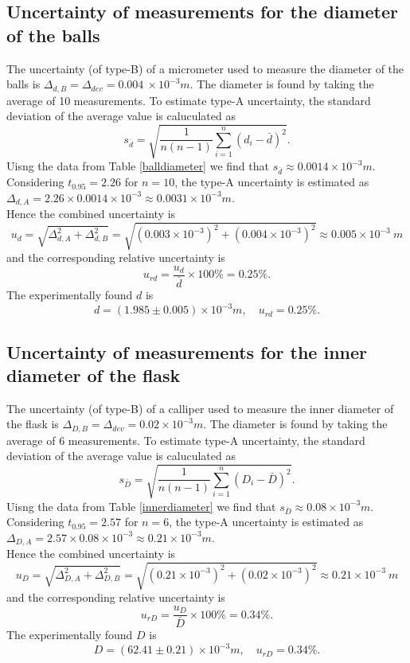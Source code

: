 \subsection{Uncertainty of measurements for the diameter of the balls}
    The uncertainty (of type-B) of a micrometer used to measure the diameter of the balls is $\Delta_{d,B}=\Delta_{dev}=0.004\ \times10^{-3}m$. The diameter is found by taking the average of 10 measurements. To estimate type-A uncertainty, the standard deviation of the average value is caluculated as
    \[
        s_{\bar{d}}=\sqrt{\frac{1}{n(n-1)}\sum_{i=1}^n(d_i-\bar{d})^2}.
    \]
    Uisng the data from Table \ref{balldiameter} we find that $s_{\bar{d}}\approx 0.0014\times10^{-3}m$. Considering $t_{0.95}=2.26$ for $n=10$, the type-A uncertainty is estimated as $\Delta_{d,A}=2.26\times0.0014\times10^{-3}\approx 0.0031\times10^{-3}m$.\\
    Hence the combined uncertainty is
    \[
        u_{d}=\sqrt{\Delta_{d,A}^2+\Delta_{d,B}^2}=\sqrt{(0.003\times10^{-3})^2+(0.004\times10^{-3})^2}\approx 0.005\times10^{-3}\ m
    \]
    and the corresponding relative uncertainty is 
    \[
        u_{rd}=\frac{u_d}{\bar{d}}\times 100\%=0.25\%.
    \]
    The experimentally found $d$ is 
    \[
        d=(1.985\pm 0.005) \times10^{-3}m,\quad u_{rd}=0.25\%.
    \]

\subsection{Uncertainty of measurements for the inner diameter of the flask}
    The uncertainty (of type-B) of a calliper used to measure the inner diameter of the flask is $\Delta_{D,B}=\Delta_{dev}=0.02\times10^{-3}m$. The diameter is found by taking the average of 6 measurements. To estimate type-A uncertainty, the standard deviation of the average value is caluculated as
    \[
        s_{\bar{D}}=\sqrt{\frac{1}{n(n-1)}\sum_{i=1}^n(D_i-\bar{D})^2}.
    \]
    Uisng the data from Table \ref{innerdiameter} we find that $s_{\bar{D}}\approx 0.08\times10^{-3}m$. Considering $t_{0.95}=2.57$ for $n=6$, the type-A uncertainty is estimated as $\Delta_{D,A}=2.57\times0.08\times10^{-3}\approx 0.21\times10^{-3}m$.\\
    Hence the combined uncertainty is
    \[
        u_{D}=\sqrt{\Delta_{D,A}^2+\Delta_{D,B}^2}=\sqrt{(0.21\times10^{-3})^2+(0.02\times10^{-3})^2}\approx 0.21\times10^{-3}\ m
    \]
    and the corresponding relative uncertainty is 
    \[
        u_{rD}=\frac{u_D}{\bar{D}}\times 100\%=0.34\%.
    \]
    The experimentally found $D$ is 
    \[
        D=(62.41\pm 0.21) \times10^{-3}m,\quad u_{rD}=0.34\%.
    \]

